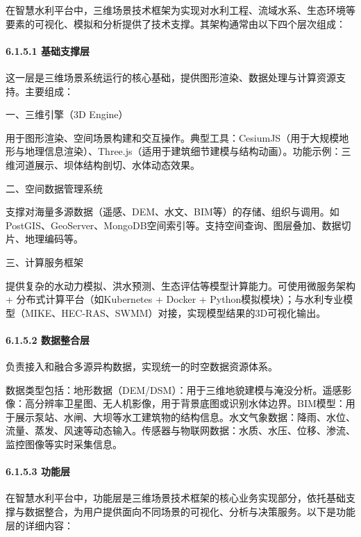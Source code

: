 在智慧水利平台中，三维场景技术框架为实现对水利工程、流域水系、生态环境等要素的可视化、模拟和分析提供了技术支撑。其架构通常由以下四个层次组成：

\hypertarget{ux57faux7840ux652fux6491ux5c42}{%
\paragraph{6.1.5.1 基础支撑层}\label{ux57faux7840ux652fux6491ux5c42}}

这一层是三维场景系统运行的核心基础，提供图形渲染、数据处理与计算资源支持。主要组成：

一、三维引擎（3D Engine）

用于图形渲染、空间场景构建和交互操作。典型工具：CesiumJS（用于大规模地形与地理信息渲染）、Three.js（适用于建筑细节建模与结构动画）。功能示例：三维河道展示、坝体结构剖切、水体动态效果。

二、空间数据管理系统

支撑对海量多源数据（遥感、DEM、水文、BIM等）的存储、组织与调用。如PostGIS、GeoServer、MongoDB空间索引等。支持空间查询、图层叠加、数据切片、地理编码等。

三、计算服务框架

提供复杂的水动力模拟、洪水预测、生态评估等模型计算能力。可使用微服务架构 + 分布式计算平台（如Kubernetes + Docker + Python模拟模块）；与水利专业模型（MIKE、HEC-RAS、SWMM）对接，实现模型结果的3D可视化输出。

\hypertarget{ux6570ux636eux6574ux5408ux5c42}{%
\paragraph{6.1.5.2 数据整合层}\label{ux6570ux636eux6574ux5408ux5c42}}

负责接入和融合多源异构数据，实现统一的时空数据资源体系。

数据类型包括：地形数据（DEM/DSM）：用于三维地貌建模与淹没分析。遥感影像：高分辨率卫星图、无人机影像，用于背景底图或识别水体边界。BIM模型：用于展示泵站、水闸、大坝等水工建筑物的结构信息。水文气象数据：降雨、水位、流量、蒸发、风速等动态输入。传感器与物联网数据：水质、水压、位移、渗流、监控图像等实时采集信息。

\hypertarget{ux529fux80fdux5c42}{%
\paragraph{6.1.5.3 功能层}\label{ux529fux80fdux5c42}}

在智慧水利平台中，功能层是三维场景技术框架的核心业务实现部分，依托基础支撑与数据整合，为用户提供面向不同场景的可视化、分析与决策服务。以下是功能层的详细内容：

